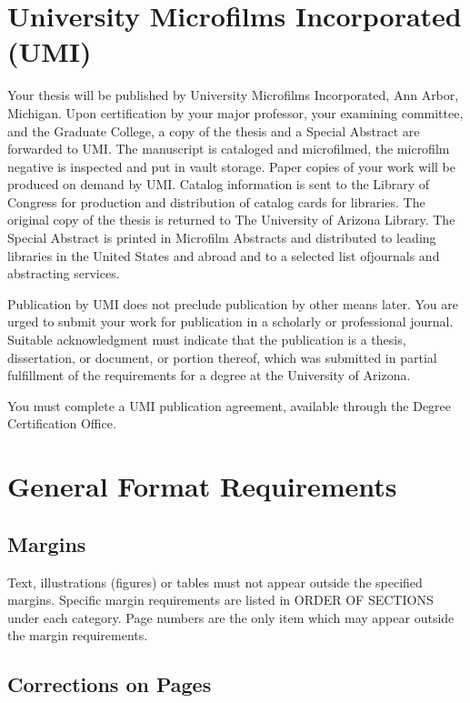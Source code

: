 \documentclass[draft]{ua-thesis}
\begin{document}
\chapter{University Microfilms Incorporated (UMI)}

Your thesis will be published by University Microfilms Incorporated, Ann
Arbor, Michigan. Upon certification by your major professor, your examining
committee, and the Graduate College, a copy of the thesis and a Special
Abstract are forwarded to UMI. The manuscript is cataloged and microfilmed,
the microfilm negative is inspected and put in vault storage. Paper copies
of your work will be produced on demand by UMI. Catalog information is sent
to the Library of Congress for production and distribution of catalog cards
for libraries. The original copy of the thesis is returned to The University
of Arizona Library. The Special Abstract is printed in Microfilm Abstracts
and distributed to leading libraries in the United States and abroad and to
a selected list ofjournals and abstracting services.

Publication by UMI does not preclude publication by other means later. You
are urged to submit your work for publication in a scholarly or professional
journal. Suitable acknowledgment must indicate that the publication is a
thesis, dissertation, or document, or portion thereof, which was submitted
in partial fulfillment of the requirements for a degree at the University of
Arizona.

You must complete a UMI publication agreement, available through the Degree
Certification Office.


\chapter{General Format Requirements}

\section{Margins}

Text, illustrations (figures) or tables must not appear outside the
specified margins. Specific margin requirements are listed in ORDER OF
SECTIONS under each category. Page numbers are the only item which may
appear outside the margin requirements.

\section{Corrections on Pages}
\end{document}
